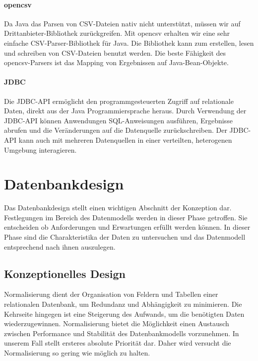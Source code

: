 \paragraph{opencsv}

Da Java das Parsen von CSV-Dateien nativ nicht unterstützt, müssen wir auf Drittanbieter-Bibliothek zurückgreifen. Mit opencsv erhalten wir eine sehr einfache CSV-Parser-Bibliothek für Java. Die Bibliothek kann zum erstellen, lesen und schreiben von CSV-Dateien benutzt werden. Die beste Fähigkeit des opencsv-Parsers ist das Mapping von Ergebnissen auf Java-Bean-Objekte.

\paragraph{JDBC}

Die JDBC-API ermöglicht den programmgesteuerten Zugriff auf relationale Daten, direkt aus der Java Programmiersprache heraus. Durch Verwendung der JDBC-API können Anwendungen SQL-Anweisungen ausführen, Ergebnisse abrufen und die Veränderungen auf die Datenquelle zurückschreiben. Der JDBC-API kann auch mit mehreren Datenquellen in einer verteilten, heterogenen Umgebung interagieren. 

\section{Datenbankdesign}

Das Datenbankdesign stellt einen wichtigen Abschnitt der Konzeption dar. Festlegungen im Bereich des Datenmodells werden in dieser Phase getroffen. Sie entscheiden ob Anforderungen und Erwartungen erfüllt werden können. In dieser Phase sind die Charakteristika der Daten zu untersuchen und das Datenmodell entsprechend nach ihnen auszulegen.

\subsection{Konzeptionelles Design}

Normalisierung dient der Organisation von Feldern und Tabellen einer relationalen Datenbank, um Redundanz und Abhängigkeit zu minimieren. Die Kehrseite hingegen ist eine Steigerung des Aufwands, um die benötigten Daten wiederzugewinnen. Normalisierung bietet die Möglichkeit einen Austausch zwischen Performance und Stabilität des Datenbankmodells vorzunehmen. 
In unserem Fall stellt ersteres absolute Priorität dar. Daher wird versucht die Normalisierung so gering wie möglich zu halten. 

